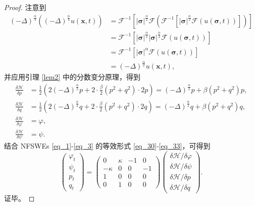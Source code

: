 \begin{proof}
注意到
\begin{align}\label{eq_12071}
(-\Delta)^{\frac{\alpha}{4}}((-\Delta)^{\frac{\alpha}{4}}  u(\boldsymbol{x},t))&=\mathcal{F}^{-1}\left[|\boldsymbol{\sigma}|^{\frac{\alpha}{2}} \mathcal{F}(\mathcal{F}^{-1}\left[|\boldsymbol{\sigma}|^{\frac{\alpha}{2}} \mathcal{F}(u(\boldsymbol{\sigma},t))\right])\right]\nonumber\\
&=\mathcal{F}^{-1}\left[|\boldsymbol{\sigma}|^{\frac{\alpha}{2}} |\boldsymbol{\sigma}|^{\frac{\alpha}{2}} \mathcal{F}(u(\boldsymbol{\sigma},t))\right]\nonumber\\
&=\mathcal{F}^{-1}\left[|\boldsymbol{\sigma}|^{\alpha} \mathcal{F}(u(\boldsymbol{\sigma},t))\right]\nonumber\\
&=(-\Delta)^{\frac{\alpha}{2}} u(\boldsymbol{x},t),
\end{align}
并应用引理 \ref{lem2} 中的分数变分原理，得到
\begin{align}
\frac{\delta \mathcal{H}}{\delta p} &=\frac{1}{2}\left(2(-\Delta)^{\frac{\alpha}{2}} p+2 \cdot \frac{\beta}{2}\left(p^{2}+q^{2}\right) \cdot 2 p\right)=(-\Delta)^{\frac{\alpha}{2}}p+\beta\left(p^{2}+q^{2}\right) p,\label{eq_38a}\\
\frac{\delta \mathcal{H}}{\delta q} &=\frac{1}{2}\left(2(-\Delta)^{\frac{\alpha}{2}} q+2 \cdot \frac{\beta}{2}\left(p^{2}+q^{2}\right) \cdot 2 q\right)=(-\Delta)^{\frac{\alpha}{2}}q+\beta\left(p^{2}+q^{2}\right) q,\label{eq_38b}\\
\frac{\delta \mathcal{H}}{\delta \varphi} &=\varphi,\label{eq_38c}\\
\frac{\delta \mathcal{H}}{\delta \psi} &=\psi.\label{eq_38}
\end{align}
结合 NFSWEs \eqref{eq_1}-\eqref{eq_3} 的等效形式 \eqref{eq_30}-\eqref{eq_33}，可得到
\begin{equation}\label{eq_39}
\left(\begin{array}{l}
		\varphi_{t} \\
		\psi_{t} \\
		p_{t} \\
		q_{t}
\end{array}\right)
=\left(\begin{array}{cccc}
			0 & \kappa & -1 & 0 \\
			-\kappa & 0 & 0 & -1 \\
			1 & 0 & 0 & 0 \\
			0 & 1 & 0 & 0
\end{array}\right)
\left(\begin{array}{l}
		\delta \mathcal{H} / \delta \varphi \\
		\delta \mathcal{H} / \delta \psi \\
		\delta \mathcal{H} / \delta p \\
		\delta \mathcal{H} / \delta q
\end{array}\right).
\end{equation}
证毕。
\end{proof}

